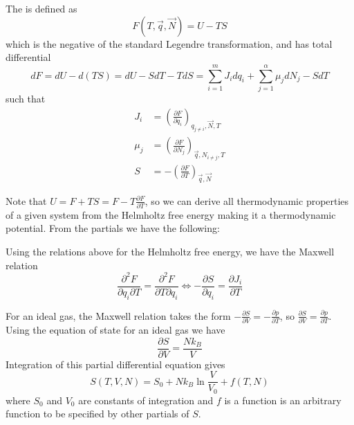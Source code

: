 \documentclass[12pt, a4paper, oneside, openright, titlepage]{book}
\begin{document}
\begin{defn}
    The  is defined as \begin{equation*}
        F(T,\vec{q},\vec{N}) = U - TS
    \end{equation*}
    which is the negative of the standard Legendre transformation, and has total differential \begin{equation*}
        dF = dU - d(TS) = dU -SdT - TdS = \sum_{i=1}^mJ_idq_i + \sum_{j=1}^{\alpha}\mu_jdN_j - SdT
    \end{equation*}
    such that \begin{align*}
        J_i &= \left(\frac{\partial F}{\partial q_i}\right)_{q_{j\neq i},\vec{N},T} \\
        \mu_j &= \left(\frac{\partial F}{\partial N_j}\right)_{\vec{q},N_{i\neq j},T} \\
        S &= - \left(\frac{\partial F}{\partial T}\right)_{\vec{q},\vec{N}} 
    \end{align*}
\end{defn}

Note that $U = F+TS = F-T\frac{\partial F}{\partial T}$, so we can derive all thermodynamic properties of a given system from the Helmholtz free energy making it a thermodynamic potential. From the partials we have the following: 

\begin{prop}
    Using the relations above for the Helmholtz free energy, we have the Maxwell relation \begin{equation*}
        \frac{\partial^2F}{\partial q_i\partial T} = \frac{\partial^2F}{\partial T\partial q_i}\iff -\frac{\partial S}{\partial q_i} = \frac{\partial J_i}{\partial T}
    \end{equation*}
\end{prop}


\begin{eg}
    For an ideal gas, the Maxwell relation takes the form $-\frac{\partial S}{\partial V} = -\frac{\partial p}{\partial T}$, so $\frac{\partial S}{\partial V} = \frac{\partial p}{\partial T}$. Using the equation of state for an ideal gas we have \begin{equation*}
        \frac{\partial S}{\partial V} = \frac{Nk_B}{V}
    \end{equation*}
    Integration of this partial differential equation gives \begin{equation*}
        S(T,V,N) = S_0+Nk_B\ln\frac{V}{V_0}+f(T,N)
    \end{equation*}
    where $S_0$ and $V_0$ are constants of integration and $f$ is a function is an arbitrary function to be specified by other partials of $S$.
\end{eg}
\end{document}
